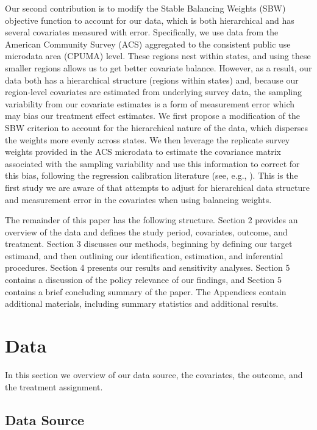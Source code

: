 \documentclass{article}
\begin{document}
Our second contribution is to modify the Stable Balancing Weights (SBW) objective function to account for our data, which is both hierarchical and has several covariates measured with error. Specifically, we use data from the American Community Survey (ACS) aggregated to the consistent public use microdata area (CPUMA) level. These regions nest within states, and using these smaller regions allows us to get better covariate balance. However, as a result, our data both has a hierarchical structure (regions within states) and, because our region-level covariates are estimated from underlying survey data, the sampling variability from our covariate estimates is a form of measurement error which may bias our treatment effect estimates. We first propose a modification of the SBW criterion to account for the hierarchical nature of the data, which disperses the weights more evenly across states. We then leverage the replicate survey weights provided in the ACS microdata to estimate the covariance matrix associated with the sampling variability and use this information to correct for this bias, following the regression calibration literature (see, e.g., \cite{gleser1992importance}). This is the first study we are aware of that attempts to adjust for hierarchical data structure and measurement error in the covariates when using balancing weights. 

The remainder of this paper has the following structure. Section 2 provides an overview of the data and defines the study period, covariates, outcome, and treatment. Section 3 discusses our methods, beginning by defining our target estimand, and then outlining our identification, estimation, and inferential procedures. Section 4 presents our results and sensitivity analyses. Section 5 contains a discussion of the policy relevance of our findings, and Section 5 contains a brief concluding summary of the paper. The Appendices contain additional materials, including summary statistics and additional results.

\section{Data}

In this section we overview of our data source, the covariates, the outcome, and the treatment assignment.

\subsection{Data Source}
\end{document}

